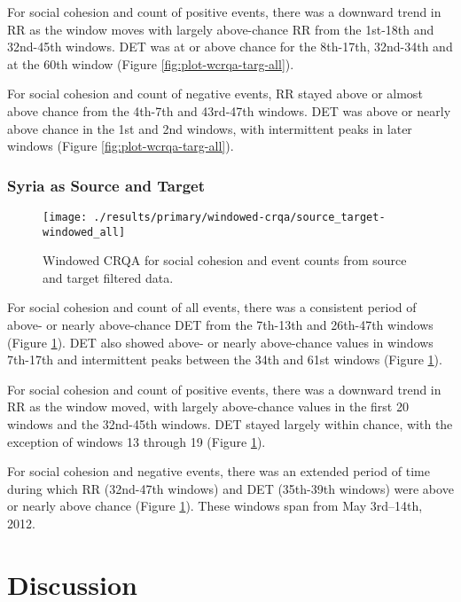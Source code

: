 \documentclass[english,man]{apa6}
\begin{document}
For social cohesion and count of positive events, there was a downward trend in RR
as the window moves with largely above-chance RR from the 1st-18th and
32nd-45th windows. DET was at or above chance for the 8th-17th,
32nd-34th and at the 60th window (Figure \ref{fig:plot-wcrqa-targ-all}).

For social cohesion and count of negative events, RR stayed above
or almost above chance from the 4th-7th and 43rd-47th windows. DET
was above or nearly above chance in the 1st and 2nd windows, with intermittent
peaks in later windows (Figure \ref{fig:plot-wcrqa-targ-all}).

\hypertarget{syria-as-source-and-target-1}{%
\subsubsection{Syria as Source and Target}\label{syria-as-source-and-target-1}}

\begin{figure}
\texttt{[image: ./results/primary/windowed-crqa/source\_target-windowed\_all]} \caption{Windowed CRQA for social cohesion and event counts from source and target filtered data.}\label{fig:plot-wcrqa-source-targ-all}
\end{figure}

For social cohesion and count of all events, there was a consistent period of
above- or nearly above-chance DET from the 7th-13th and 26th-47th
windows (Figure \ref{fig:plot-wcrqa-source-targ-all}). DET also
showed above- or nearly above-chance values in windows 7th-17th and
intermittent peaks between the 34th and 61st windows (Figure
\ref{fig:plot-wcrqa-source-targ-all}).

For social cohesion and count of
positive events, there was a downward trend in RR as the window moved, with
largely above-chance values in the first 20 windows and the 32nd-45th windows.
DET stayed largely within chance, with the exception of windows 13
through 19 (Figure \ref{fig:plot-wcrqa-source-targ-all}).

For social cohesion
and negative events, there was an extended period of time during which RR
(32nd-47th windows) and DET (35th-39th windows) were above or nearly above
chance (Figure \ref{fig:plot-wcrqa-source-targ-all}). These windows span from
May 3rd--14th, 2012.

\hypertarget{discussion}{%
\section{Discussion}\label{discussion}}
\end{document}
